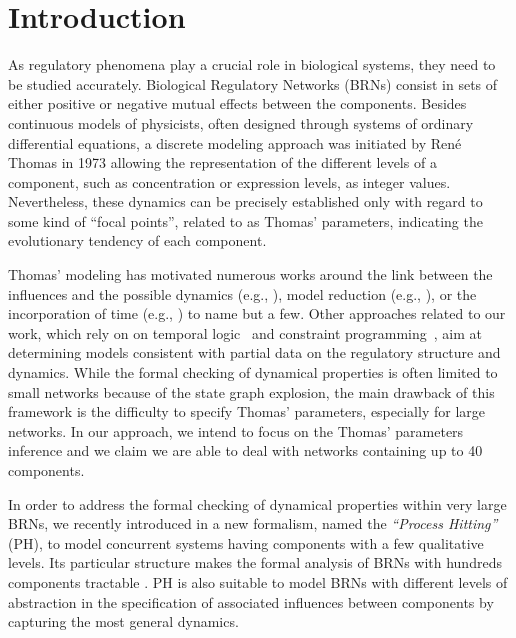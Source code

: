 \section{Introduction}
As regulatory phenomena play a crucial role in biological systems, they need to be studied accurately.
Biological Regulatory Networks (BRNs) consist in sets of either positive or negative mutual effects between the components.
Besides continuous models of physicists, often designed through systems of ordinary
differential equations, a discrete modeling approach was initiated by René Thomas in 1973
\cite{Thomas73} allowing the representation of the different levels of a component, such as concentration or expression levels, as integer values.
Nevertheless, these dynamics can be precisely established only with regard to some kind of ``focal points'', related to as Thomas' parameters, indicating the evolutionary tendency of each component.

Thomas' modeling has motivated numerous works around the link between the influences
and the possible dynamics (e.g., \cite{RiCo07}), %
model reduction (e.g., \cite{Naldi09}), %
or the incorporation of time (e.g., \cite{Siebert06,Ahmad08}) %
to name but a few.
Other approaches related to our work, which rely on on temporal logic~\cite{Khalis09} and constraint programming~\cite{20646302,DBLP:conf/ipcat/CorblinFTCT12},
aim at determining models consistent with partial data on the regulatory structure and dynamics.
While the formal checking of dynamical properties is often limited to small networks because of the
state graph explosion, the main drawback of this framework is the difficulty to specify Thomas'
parameters, especially for large networks.
In our approach, we intend to focus on the Thomas' parameters inference and we claim we are able to deal with networks containing up to 40 components.

In order to address the formal checking of dynamical properties within very large BRNs, we recently
introduced in \cite{PMR10-TCSB} a new formalism, named the \emph{``Process Hitting''} (PH), to model
concurrent systems having components with a few qualitative levels.
Its particular structure makes the formal analysis of BRNs with hundreds components tractable \cite{PMR12-MSCS}.
PH is also suitable to model BRNs with different levels of abstraction in the specification of
associated influences between components by capturing the most general dynamics.


